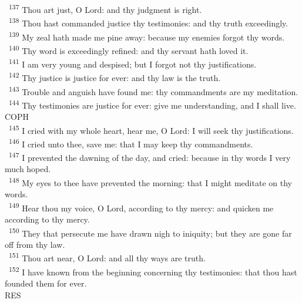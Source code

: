 \documentclass[a5paper,12pt]{article}
\begin{document}
\begin{multicols*}{2}
~\textsuperscript{137} Thou art just, O Lord: and thy judgment is right.\\
~\textsuperscript{138} Thou hast commanded justice thy testimonies: and thy truth exceedingly.\\
~\textsuperscript{139} My zeal hath made me pine away: because my enemies forgot thy words.\\
~\textsuperscript{140} Thy word is exceedingly refined: and thy servant hath loved it.\\
~\textsuperscript{141} I am very young and despised; but I forgot not thy justifications.\\
~\textsuperscript{142} Thy justice is justice for ever: and thy law is the truth.\\
~\textsuperscript{143} Trouble and anguish have found me: thy commandments are my meditation.\\
~\textsuperscript{144} Thy testimonies are justice for ever: give me understanding, and I shall live.\\

COPH\\

~\textsuperscript{145} I cried with my whole heart, hear me, O Lord: I will seek thy justifications.\\
~\textsuperscript{146} I cried unto thee, save me: that I may keep thy commandments.\\
~\textsuperscript{147} I prevented the dawning of the day, and cried: because in thy words I very much hoped.\\
~\textsuperscript{148} My eyes to thee have prevented the morning: that I might meditate on thy words.\\
~\textsuperscript{149} Hear thou my voice, O Lord, according to thy mercy: and quicken me according to thy mercy.\\
~\textsuperscript{150} They that persecute me have drawn nigh to iniquity; but they are gone far off from thy law.\\
~\textsuperscript{151} Thou art near, O Lord: and all thy ways are truth.\\
~\textsuperscript{152} I have known from the beginning concerning thy testimonies: that thou hast founded them for ever.\\

RES\\


\end{multicols*}
\end{document}
